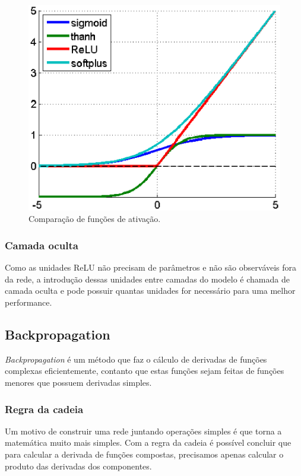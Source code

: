 \begin{figure}[H]
\centering
\includegraphics[scale=0.6]{imagens/activation_funcs.eps}
\caption{Comparação de funções de ativação.}
\label{fig:activation_funcs}
\end{figure}

\subsubsection{Camada oculta}

Como as unidades ReLU não precisam de parâmetros e não são observáveis
fora da rede, a introdução dessas unidades entre camadas do modelo é
chamada de camada oculta e pode possuir quantas unidades for
necessário para uma melhor performance.

\subsection{Backpropagation}

\textit{Backpropagation} é um método que faz o cálculo de derivadas de
funções complexas eficientemente, contanto que estas funções sejam
feitas de funções menores que possuem derivadas simples.

\subsubsection{Regra da cadeia}

Um motivo de construir uma rede juntando operações simples é que torna
a matemática muito mais simples. Com a regra da cadeia é possível
concluir que para calcular a derivada de funções compostas, precisamos
apenas calcular o produto das derivadas dos componentes.

